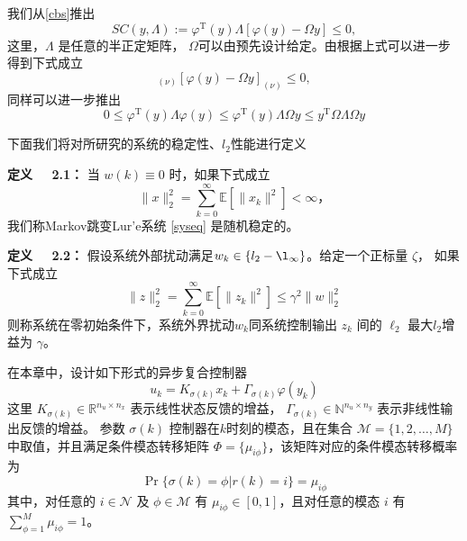 	我们从\eqref{cbs}推出
	\begin{equation}\label{scieq}
	SC(y,\varLambda):= \varphi^{\mathrm{T}}(y)\varLambda[\varphi(y)-\varOmega y]\leq0,
	\end{equation}
	这里，$\varLambda$ 是任意的半正定矩阵， $\varOmega$可以由预先设计给定。由根据上式可以进一步得到下式成立
	\begin{equation}
	[\varOmega y]_{(\nu)}[\varphi(y)-\varOmega y]_{(\nu)}\leq0,
	\end{equation}
	同样可以进一步推出
	\begin{equation}
	0\leq\varphi^{\mathrm{T}}(y)\varLambda\varphi(y) \leq \varphi^{\mathrm{T}}(y)\varLambda\varOmega y \leq y^{\mathrm{T}}\varOmega\varLambda\varOmega y
	\end{equation}
	
	下面我们将对所研究的系统的稳定性、$l_2$性能进行定义
	
	{\bf 定义 \ \ 2.1：} 
	当 $w(k)\equiv0$ 时，如果下式成立
	\begin{equation}
	\|x\|^2_2=\sum_{k=0}^{\infty}\mathbb{E}[\|x_k\|^2]<\infty，
	\end{equation} 
	我们称Markov跳变Lur'e系统 \eqref{syseq} 是随机稳定的。
	
	{\bf 定义 \ \ 2.2：}
	假设系统外部扰动满足$w_k\in \{l_2-\l_\infty\}$。给定一个正标量 $\zeta$， 如果下式成立
	\begin{equation}
		\|z\|^2_2=\sum_{k=0}^{\infty}\mathbb{E}\left[\|z_k\|^2\right] \leq \gamma^{2}\|w\|^2_2
	\end{equation}
	则称系统在零初始条件下，系统外界扰动$w_k$同系统控制输出 $z_k$ 间的 $\ell_2$ 最大$l_2$增益为 $\gamma$。
	
	在本章中，设计如下形式的异步复合控制器
	\begin{equation}\label{asycontroller}
	u_k=K_{\sigma(k)}x_k+\varGamma_{\sigma(k)}\varphi(y_k) 
	\end{equation}
	这里 $K_{\sigma(k)}\in \mathbb{R}^{n_u\times n_x}$ 表示线性状态反馈的增益， $\varGamma_{\sigma(k)}\in \mathbb{N}^{n_u\times n_y}$ 表示非线性输出反馈的增益。 参数 $\sigma(k)$ 控制器在$k$时刻的模态，且在集合  $\mathcal{M}=\{1,2,\dots,M\}$ 中取值，并且满足条件模态转移矩阵 $\varPhi=\{\mu_{i\phi} \}$，该矩阵对应的条件模态转移概率为
	\begin{equation}
	\Pr\{\sigma(k)=\phi|r(k)=i\}=\mu_{i\phi}
	\end{equation}
	其中，对任意的 $i\in\mathcal{N}$ 及 $\phi\in\mathcal{M}$ 有 $\mu_{i\phi}\in [0,1]$，且对任意的模态 $i$ 有 $\sum_{\phi=1}^{M}\mu_{i\phi}=1$。
	
